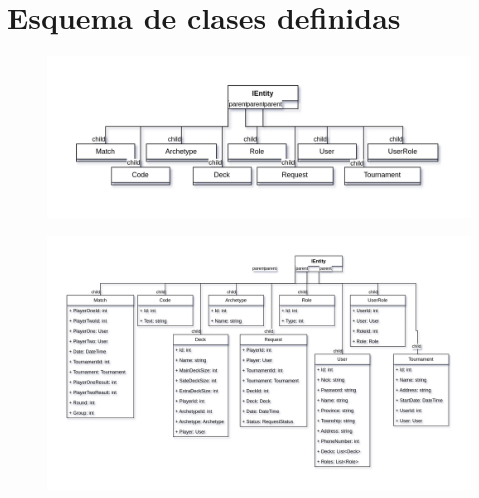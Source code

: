 \documentclass[a4paper]{article}
\begin{document}
\newpage
\section{Esquema de clases definidas}
	\begin{figure}[h]
  		\includegraphics[width=1\textwidth]{ClasesDefinidas.png} 
	\end{figure}
	\begin{figure}[h]
  		\includegraphics[width=1\textwidth]{ClasesDefinidasExtendido.png} 
	\end{figure}
\end{document}
